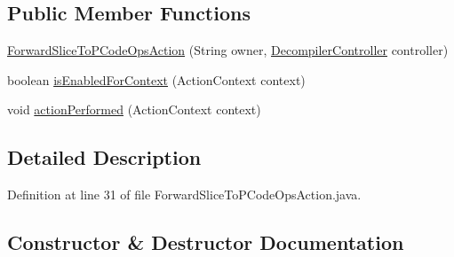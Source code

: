 \subsection*{Public Member Functions}
\begin{DoxyCompactItemize}
\item 
\mbox{\hyperlink{classghidra_1_1app_1_1plugin_1_1core_1_1decompile_1_1actions_1_1_forward_slice_to_p_code_ops_action_a91d74c56b5ad014f5324ea047c9042bb}{Forward\+Slice\+To\+P\+Code\+Ops\+Action}} (String owner, \mbox{\hyperlink{classghidra_1_1app_1_1decompiler_1_1component_1_1_decompiler_controller}{Decompiler\+Controller}} controller)
\item 
boolean \mbox{\hyperlink{classghidra_1_1app_1_1plugin_1_1core_1_1decompile_1_1actions_1_1_forward_slice_to_p_code_ops_action_a5613df436b98ac3fd0451ffa778fe692}{is\+Enabled\+For\+Context}} (Action\+Context context)
\item 
void \mbox{\hyperlink{classghidra_1_1app_1_1plugin_1_1core_1_1decompile_1_1actions_1_1_forward_slice_to_p_code_ops_action_ab96fb3bdfa2b676c3d2202539dc6a179}{action\+Performed}} (Action\+Context context)
\end{DoxyCompactItemize}


\subsection{Detailed Description}


Definition at line 31 of file Forward\+Slice\+To\+P\+Code\+Ops\+Action.\+java.



\subsection{Constructor \& Destructor Documentation}
\mbox{\label{classghidra_1_1app_1_1plugin_1_1core_1_1decompile_1_1actions_1_1_forward_slice_to_p_code_ops_action_a91d74c56b5ad014f5324ea047c9042bb}} 
